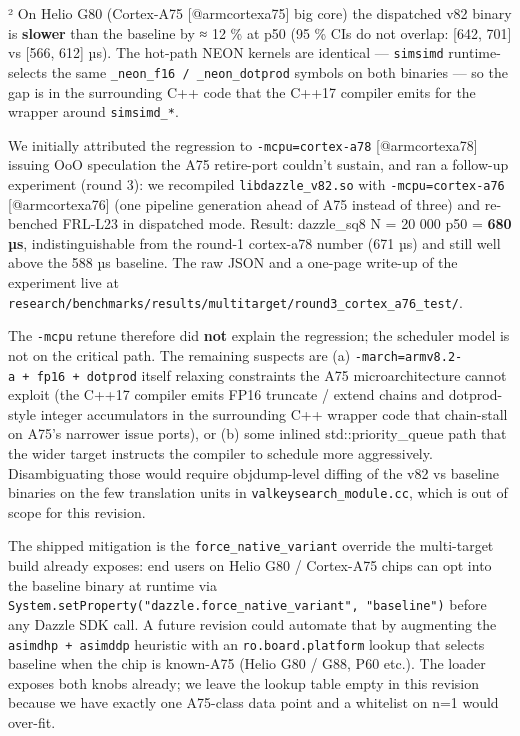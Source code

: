 \begin{enumerate}
  ² On Helio G80 (Cortex-A75 {[}@armcortexa75{]} big core) the dispatched v82
  binary is \textbf{slower} than the baseline by ≈ 12 \% at p50 (95 \% CIs do
  not overlap: {[}642, 701{]} vs {[}566, 612{]} µs). The hot-path NEON kernels
  are identical --- \texttt{simsimd} runtime- selects the same
  \texttt{\_neon\_f16\ /\ \_neon\_dotprod} symbols on both binaries --- so the
  gap is in the surrounding C++ code that the C++17 compiler emits for the
  wrapper around \texttt{simsimd\_*}.

  We initially attributed the regression to \texttt{-mcpu=cortex-a78}
  {[}@armcortexa78{]} issuing OoO speculation the A75 retire-port couldn't
  sustain, and ran a follow-up experiment (round 3): we recompiled
  \texttt{libdazzle\_v82.so} with \texttt{-mcpu=cortex-a76} {[}@armcortexa76{]}
  (one pipeline generation ahead of A75 instead of three) and re-benched FRL-L23
  in dispatched mode. Result: dazzle\_sq8 N = 20 000 p50 = \textbf{680 µs},
  indistinguishable from the round-1 cortex-a78 number (671 µs) and still well
  above the 588 µs baseline. The raw JSON and a one-page write-up of the
  experiment live at
  \texttt{research/benchmarks/results/multitarget/round3\_cortex\_a76\_test/}.

  The \texttt{-mcpu} retune therefore did \textbf{not} explain the regression;
  the scheduler model is not on the critical path. The remaining suspects are
  (a) \texttt{-march=armv8.2-a\ +\ fp16\ +\ dotprod} itself relaxing constraints
  the A75 microarchitecture cannot exploit (the C++17 compiler emits FP16
  truncate / extend chains and dotprod-style integer accumulators in the
  surrounding C++ wrapper code that chain-stall on A75's narrower issue ports),
  or (b) some inlined std::priority\_queue path that the wider target instructs
  the compiler to schedule more aggressively. Disambiguating those would require
  objdump-level diffing of the v82 vs baseline binaries on the few translation
  units in \texttt{valkeysearch\_module.cc}, which is out of scope for this
  revision.

  The shipped mitigation is the \texttt{force\_native\_variant} override the
  multi-target build already exposes: end users on Helio G80 / Cortex-A75 chips
  can opt into the baseline binary at runtime via
  \texttt{System.setProperty("dazzle.force\_native\_variant",\ "baseline")}
  before any Dazzle SDK call. A future revision could automate that by
  augmenting the \texttt{asimdhp\ +\ asimddp} heuristic with an
  \texttt{ro.board.platform} lookup that selects baseline when the chip is
  known-A75 (Helio G80 / G88, P60 etc.). The loader exposes both knobs already;
  we leave the lookup table empty in this revision because we have exactly one
  A75-class data point and a whitelist on n=1 would over-fit.


\end{enumerate}
